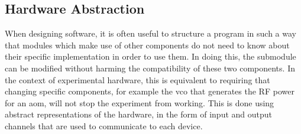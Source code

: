 \subsection{Hardware Abstraction}\label{subsec:compinterface_hwabstraction}
When designing software, it is often useful to structure a program in such a way that modules which make use of other components do not need to know about their specific implementation in order to use them. In doing this, the submodule can be modified without harming the compatibility of these two components. In the context of experimental hardware, this is equivalent to requiring that changing specific components, for example the \ac{vco} that generates the RF power for an \ac{aom}, will not stop the experiment from working. This is done using abstract representations of the hardware, in the form of input and output channels that are used to communicate to each device. 
